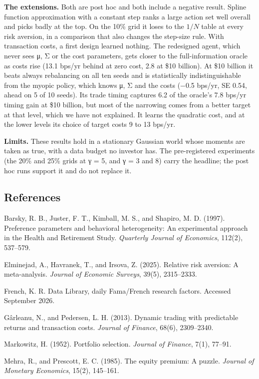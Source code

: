 \documentclass[
  11pt]{article}
\begin{document}
\textbf{The extensions.} Both are post hoc and both include a negative
result. Spline function approximation with a constant step ranks a large
action set well overall and picks badly at the top. On the 10\% grid it
loses to the \(1/N\) table at every risk aversion, in a comparison that
also changes the step-size rule. With transaction costs, a first design
learned nothing. The redesigned agent, which never sees μ, Σ or the cost
parameters, gets closer to the full-information oracle as costs rise
(13.1 bps/yr behind at zero cost, 2.8 at \$10 billion). At \$10 billion
it beats always rebalancing on all ten seeds and is statistically
indistinguishable from the myopic policy, which knows μ, Σ and the costs
(−0.5 bps/yr, SE 0.54, ahead on 5 of 10 seeds). Its trade timing
captures 6.2 of the oracle's 7.8 bps/yr timing gain at \$10 billion, but
most of the narrowing comes from a better target at that level, which we
have not explained. It learns the quadratic cost, and at the lower
levels its choice of target costs 9 to 13 bps/yr.

\textbf{Limits.} These results hold in a stationary Gaussian world whose
moments are taken as true, with a data budget no investor has. The
pre-registered experiments (the 20\% and 25\% grids at γ = 5, and γ = 3
and 8) carry the headline; the post hoc runs support it and do not
replace it.

\subsection{References}\label{references}

Barsky, R. B., Juster, F. T., Kimball, M. S., and Shapiro, M. D. (1997).
Preference parameters and behavioral heterogeneity: An experimental
approach in the Health and Retirement Study. \emph{Quarterly Journal of
Economics}, 112(2), 537--579.

Elminejad, A., Havranek, T., and Irsova, Z. (2025). Relative risk
aversion: A meta-analysis. \emph{Journal of Economic Surveys}, 39(5),
2315--2333.

French, K. R. Data Library, daily Fama/French research factors. Accessed
September 2026.

Gârleanu, N., and Pedersen, L. H. (2013). Dynamic trading with
predictable returns and transaction costs. \emph{Journal of Finance},
68(6), 2309--2340.

Markowitz, H. (1952). Portfolio selection. \emph{Journal of Finance},
7(1), 77--91.

Mehra, R., and Prescott, E. C. (1985). The equity premium: A puzzle.
\emph{Journal of Monetary Economics}, 15(2), 145--161.
\end{document}
